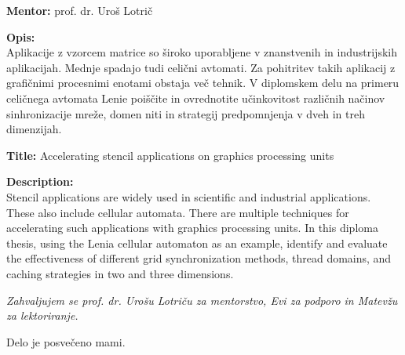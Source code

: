 \documentclass[a4paper, 12pt, openright]{book}
\newcommand{\ttitleEn}{Accelerating stencil applications on graphics processing units}
\newcommand{\clearemptydoublepage}{\newpage{\pagestyle{empty}\cleardoublepage}}
\begin{document}
\noindent\textbf{Mentor:} prof. dr. Uroš Lotrič

\bigskip
\noindent\textbf{Opis:}\\
Aplikacije z vzorcem matrice so široko uporabljene v znanstvenih in industrijskih aplikacijah.
Mednje spadajo tudi celični avtomati.
Za pohitritev takih aplikacij z grafičnimi procesnimi enotami obstaja več tehnik.
V diplomskem delu na primeru celičnega avtomata Lenie poiščite in ovrednotite učinkovitost različnih načinov sinhronizacije mreže, domen niti in strategij predpomnjenja v dveh in treh dimenzijah.

\bigskip
\noindent\textbf{Title:} \ttitleEn

\bigskip
\noindent\textbf{Description:}\\
Stencil applications are widely used in scientific and industrial applications.
These also include cellular automata.
There are multiple techniques for accelerating such applications with graphics processing units.
In this diploma thesis, using the Lenia cellular automaton as an example, identify and evaluate the effectiveness of different grid synchronization methods, thread domains, and caching strategies in two and three dimensions.

\vfill



\vspace{2cm}

\clearemptydoublepage

\thispagestyle{empty}\mbox{}\vfill\null\it
\noindent
Zahvaljujem se prof. dr. Urošu Lotriču za mentorstvo, Evi za podporo in Matevžu za lektoriranje.
\rm\normalfont

\clearemptydoublepage

\thispagestyle{empty}\mbox{}{\textheight}\mbox{}\hfill\begin{minipage}{0.55\textwidth}
Delo je posvečeno mami.
\normalfont\end{minipage}

\clearemptydoublepage


\pagestyle{empty}
\def\thepage{}  %
\tableofcontents{}
\end{document}
